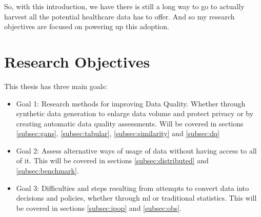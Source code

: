 So, with this introduction, we have there is still a long way to go to actually harvest all the potential healthcare data has to offer. And so my research objectives are focused on powering up this adoption.
\section{Research Objectives}
This thesis has three main goals:


\begin{itemize}
    \item Goal 1: Research methods for improving Data Quality. Whether through synthetic data generation to enlarge data volume and protect privacy or by creating automatic data quality assessments. Will be covered in sections \ref{subsec:gans}, \ref{subsec:tabular}, \ref{subsec:similarity} and \ref{subsec:dq}

    \item Goal 2: Assess alternative ways of usage of data without having access to all of it. This will be covered in sections \ref{subsec:distributed} and \ref{subsec:benchmark}.

    \item Goal 3: Difficulties and steps resulting from attempts to convert data into decisions and policies, whether through \ac{ml} or traditional statistics. This will be covered in sections \ref{subsec:ipop} and \ref{subsec:obs}.
\end{itemize}